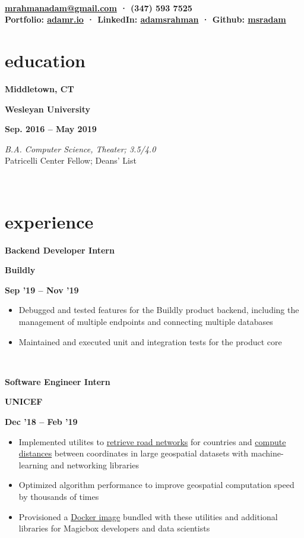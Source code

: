 \documentclass[letterpaper, 11pt]{article}
\author{Adam Rahman}
\makeatletter
\renewcommand{\maketitle}{
	\hspace{.125\textwidth}
	\begin{minipage}[t]{.75\textwidth}
    \begin{center}
        \fontsize{15pt}{15pt}\selectfont\bfseries \theauthor \\
        \fontsize{10pt}{15pt}\selectfont\sf
        \href{mailto:mrahmanadam@gmail.com}{mrahmanadam@gmail.com} · (347) 593 7525 \\
        Portfolio: \href{http://adamr.io}{adamr.io} · 
        LinkedIn: \href{https://www.linkedin.com/in/adamsrahman/}{adamsrahman} · 
        Github: \href{https://github.com/msradam}{msradam}  \\ 
        \end{center}
    \end{minipage}}
\newcommand{\eduentry}[4]{
    \begin{center}
        \begin{minipage}[b]{0.33333\textwidth}
        \raggedright
        \bf\large Middletown, CT
        \end{minipage}%
        \begin{minipage}[b]{0.33333\textwidth}
        \centering
        \bf\large#2
        \end{minipage}%
        \begin{minipage}[b]{0.33333\textwidth}
        \raggedleft
        \bf\large Sep. 2016 -- May 2019
        \end{minipage}
    \end{center}
    \begin{minipage}[t]{.80\linewidth}
    \vspace{-5mm}
    \textit{#3} \small{#4}
    \end{minipage}\\
    \vspace{2mm}
    }
\newcommand{\expentry}[5]{
    \begin{center}
        \begin{minipage}[b]{0.33333\textwidth}
        \raggedright
        \bf\large #4
        \end{minipage}%
        \begin{minipage}[b]{0.33333\textwidth}
        \centering
        \bf\large#3
        \end{minipage}%
        \begin{minipage}[b]{0.33333\textwidth}
        \raggedleft
        \bf\large {#1} -- {#2}
        \end{minipage}
    \end{center}
    \begin{minipage}[t]{\linewidth}
    \vspace{-6mm}
    \small{#5}
    \end{minipage}\\
    \vspace{1mm}
    }
\makeatother
\begin{document}
    \maketitle
    \vspace{.10cm}


    \section{education}
    \eduentry{2016--2019}
    {Wesleyan University}
    {B.A. Computer Science, Theater; 3.5/4.0}
    {\\ Patricelli Center Fellow; Deans' List}

    \section{experience}
    \expentry{Sep '19}
    {Nov '19}
    {Buildly}
    {Backend Developer Intern}
    {

        \begin{itemize}
          \setlength\itemsep{0.1mm}
          \item Debugged and tested features for the Buildly product backend, including the management of multiple endpoints and connecting multiple databases
          \item Maintained and executed unit and integration tests for the product core 
        \end{itemize}
        
    }

    \expentry{Dec '18}
    {Feb '19}
    {UNICEF}
    {Software Engineer Intern}
    {

        \begin{itemize}{\leftmargin=0.5em \itemindent=0em}
          \setlength\itemsep{0.1mm}
          \item Implemented utilites to \href{https://github.com/unicef/magicbox-download-roads}{retrieve road networks} for countries and \href{https://github.com/msradam/magicbox-site-routing}{compute distances} between coordinates in large geospatial datasets with machine-learning and networking libraries
          \item Optimized algorithm performance to improve geospatial computation speed by thousands of times 
          \item Provisioned a \href{https://hub.docker.com/r/msradam/magicbox-tools}{Docker image} bundled with these utilities and additional libraries for Magicbox developers and data scientists
        \end{itemize}
        
    }
\end{document}
